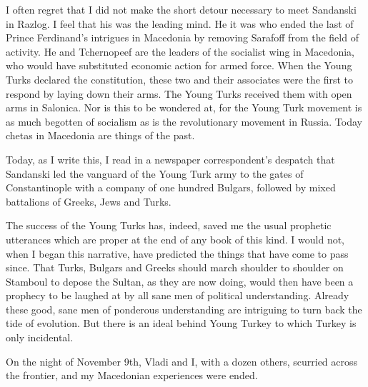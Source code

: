 \documentclass[a5paper,12pt]{book}
\begin{document}
I often regret that I did not make the short detour necessary to meet Sandanski in Razlog. I feel that his was the leading mind. He it was who ended the last of Prince Ferdinand’s intrigues in Macedonia by removing Sarafoff from the field of activity. He and Tchernopeef are the leaders of the socialist wing in Macedonia, who would have substituted economic action for armed force. When the Young Turks declared the constitution, these two and their associates were the first to respond by laying down their arms. The Young Turks received them with open arms in Salonica. Nor is this to be wondered at, for the Young Turk movement is as much begotten of socialism as is the revolutionary movement in Russia. Today chetas in Macedonia are things of the past.

Today, as I write this, I read in a newspaper correspondent’s despatch that Sandanski led the vanguard of the Young Turk army to the gates of Constantinople with a company of one hundred Bulgars, followed by mixed battalions of Greeks, Jews and Turks.

The success of the Young Turks has, indeed, saved me the usual prophetic utterances which are proper at the end of any book of this kind. I would not, when I began this narrative, have predicted the things that have come to pass since. That Turks, Bulgars and Greeks should march shoulder to shoulder on Stamboul to depose the Sultan, as they are now doing, would then have been a prophecy to be laughed at by all sane men of political understanding. Already these good, sane men of ponderous understanding are intriguing to turn back the tide of evolution. But there is an ideal behind Young Turkey to which Turkey is only incidental.

On the night of November 9th, Vladi and I, with a dozen others, scurried across the frontier, and my Macedonian experiences were ended.

\backmatter
\end{document}
